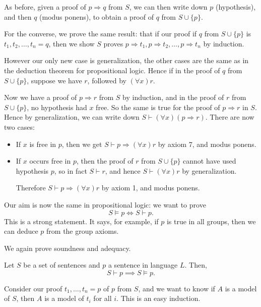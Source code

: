 \documentclass[12pt]{article}
\begin{document}
\begin{proofbox}
	As before, given a proof of $p \Rightarrow q$ from $S$, we can then write down $p$ (hypothesis), and then $q$ (modus ponens), to obtain a proof of $q$ from $S \cup \{p\}$.

	For the converse, we prove the same result: that if our proof if $q$ from $S \cup \{p\}$ is $t_1, t_2, \ldots, t_n = q$, then we show $S$ proves $p \Rightarrow t_1, p \Rightarrow t_2, \ldots, p \Rightarrow t_n$ by induction.

	However our only new case is generalization, the other cases are the same as in the deduction theorem for propositional logic. Hence if in the proof of $q$ from $S \cup \{p\}$, suppose we have $r$, followed by $(\forall x)r$.

	Now we have a proof of $p \Rightarrow r$ from $S$ by induction, and in the proof of $r$ from $S \cup \{p\}$, no hypothesis had $x$ free. So the same is true for the proof of $p \Rightarrow r$ in $S$. Hence by generalization, we can write down $S \vdash (\forall x)(p \Rightarrow r)$. There are now two cases:
	\begin{itemize}
		\item If $x$ is free in $p$, then we get $S \vdash p \Rightarrow(\forall x) r$ by axiom 7, and modus ponens.
		\item If $x$ occurs free in $p$, then the proof of $r$ from $S \cup \{p\}$ cannot have used hypothesis $p$, so in fact $S \vdash r$, and hence $S \vdash (\forall x)r$ by generalization.

			Therefore $S \vdash p \Rightarrow (\forall x) r$ by axiom 1, and modus ponens.
	\end{itemize}
\end{proofbox}

Our aim is now the same in propositional logic: we want to prove
\[
S \models p \iff S \vdash p.
\]
This is a strong statement. It says, for example, if $p$ is true in all groups, then we can deduce $p$ from the group axioms.

We again prove soundness and adequacy.

\begin{proposition}[Soundness]
	Let $S$ be a set of sentences and $p$ a sentence in language $L$. Then,
	\[
	S \vdash p \implies S \models p.
	\]
\end{proposition}

\begin{proofbox}
	Consider our proof $t_1, \ldots, t_n = p$ of $p$ from $S$, and we want to know if $A$ is a model of $S$, then $A$ is a model of $t_i$ for all $i$. This is an easy induction.
\end{proofbox}
\end{document}
